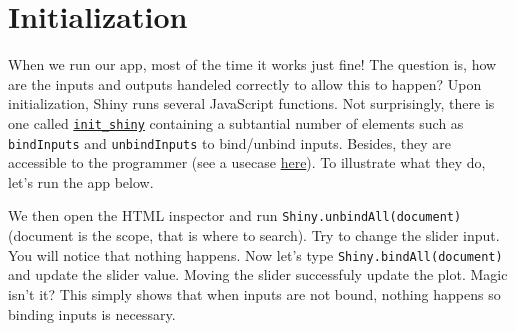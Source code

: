 \documentclass[
]{book}
\newenvironment{Shaded}{\begin{snugshade}}{\end{snugshade}}
\newcommand{\ControlFlowTok}[1]{\textcolor[rgb]{0.13,0.29,0.53}{\textbf{#1}}}
\newcommand{\DataTypeTok}[1]{\textcolor[rgb]{0.13,0.29,0.53}{#1}}
\newcommand{\DecValTok}[1]{\textcolor[rgb]{0.00,0.00,0.81}{#1}}
\newcommand{\KeywordTok}[1]{\textcolor[rgb]{0.13,0.29,0.53}{\textbf{#1}}}
\newcommand{\NormalTok}[1]{#1}
\newcommand{\OperatorTok}[1]{\textcolor[rgb]{0.81,0.36,0.00}{\textbf{#1}}}
\newcommand{\StringTok}[1]{\textcolor[rgb]{0.31,0.60,0.02}{#1}}
\begin{document}
\hypertarget{initialization}{%
\section{Initialization}\label{initialization}}

When we run our app, most of the time it works just fine! The question is, how are the inputs and outputs handeled correctly to allow this to happen? Upon initialization, Shiny runs several JavaScript functions. Not surprisingly, there is one called \href{https://github.com/rstudio/shiny/blob/master/srcjs/init_shiny.js}{\texttt{init\_shiny}} containing a subtantial number of elements such as \texttt{bindInputs} and \texttt{unbindInputs} to bind/unbind inputs. Besides, they are accessible to the programmer (see a usecase \href{https://stackoverflow.com/questions/51633326/dateinput-not-working-on-dt-in-shiny}{here}). To illustrate what they do, let's run the app below.

\begin{Shaded}
\end{Shaded}

We then open the HTML inspector and run \texttt{Shiny.unbindAll(document)} (document is the scope, that is where to search). Try to change the slider input. You will notice that nothing happens. Now let's type \texttt{Shiny.bindAll(document)} and update the slider value. Moving the slider successfuly update the plot. Magic isn't it? This simply shows that when inputs are not bound, nothing happens so binding inputs is necessary.
\end{document}
